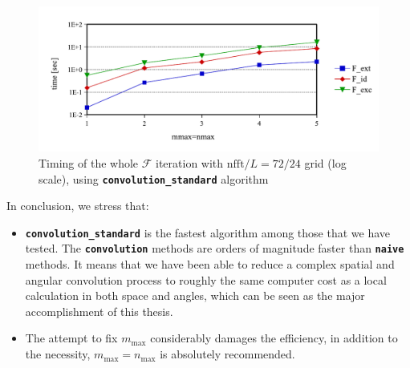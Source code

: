 \begin{figure}[H]
\begin{centering}
\includegraphics[bb=0bp 20bp 504bp 196bp,scale=0.7]{_figure/results/global_perf}
\par\end{centering}
\caption[Timing of the whole $\mathcal{F}$ iteration]{Timing of the whole $\mathcal{F}$ iteration with $\mathrm{nfft}/L=72/24$
grid (log scale), using \texttt{\textbf{convolution\_standard}} algorithm
\label{fig:Timing-full}}
\end{figure}

In conclusion, we stress that:
\begin{itemize}
\item \texttt{\textbf{convolution\_standard}} is the fastest algorithm among
those that we have tested. The \texttt{\textbf{convolution}} methods
are orders of magnitude faster than \texttt{\textbf{naive}} methods.
It means that we have been able to reduce a complex spatial and angular
convolution process to roughly the same computer cost as a local calculation
in both space and angles, which can be seen as the major accomplishment
of this thesis.
\item The attempt to fix $m_{\max}$ considerably damages the efficiency,
in addition to the necessity, $m_{\max}=n_{\max}$ is absolutely recommended.
\end{itemize}

